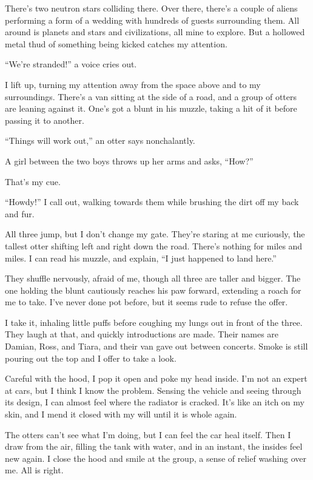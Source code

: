 There's two neutron stars colliding there. Over there, there's a couple
of aliens performing a form of a wedding with hundreds of guests
surrounding them. All around is planets and stars and civilizations, all
mine to explore. But a hollowed metal thud of something being kicked
catches my attention.

``We're stranded!'' a voice cries out.

I lift up, turning my attention away from the space above and to my
surroundings. There's a van sitting at the side of a road, and a group
of otters are leaning against it. One's got a blunt in his muzzle,
taking a hit of it before passing it to another.

``Things will work out,'' an otter says nonchalantly.

A girl between the two boys throws up her arms and asks, ``How?''

That's my cue.

``Howdy!'' I call out, walking towards them while brushing the dirt off my
back and fur.

All three jump, but I don't change my gate. They're staring at me
curiously, the tallest otter shifting left and right down the road.
There's nothing for miles and miles. I can read his muzzle, and explain,
``I just happened to land here.''

They shuffle nervously, afraid of me, though all three are taller and
bigger. The one holding the blunt cautiously reaches his paw forward,
extending a roach for me to take. I've never done pot before, but it
seems rude to refuse the offer.

I take it, inhaling little puffs before coughing my lungs out in front
of the three. They laugh at that, and quickly introductions are made.
Their names are Damian, Ross, and Tiara, and their van gave out between
concerts. Smoke is still pouring out the top and I offer to take a look.

Careful with the hood, I pop it open and poke my head inside. I'm not an
expert at cars, but I think I know the problem. Sensing the vehicle and
seeing through its design, I can almost feel where the radiator is
cracked. It's like an itch on my skin, and I mend it closed with my will
until it is whole again.

The otters can't see what I'm doing, but I can feel the car heal itself.
Then I draw from the air, filling the tank with water, and in an
instant, the insides feel new again. I close the hood and smile at the
group, a sense of relief washing over me. All is right.

